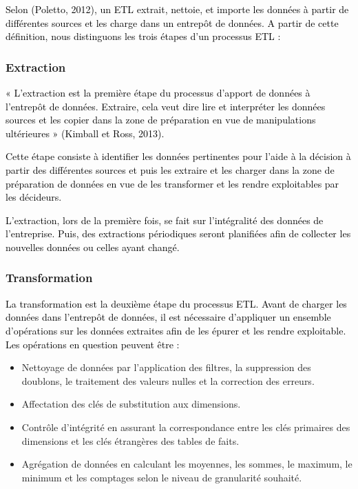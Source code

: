 \textcolor{black}{
Selon (Poletto, 2012), un ETL extrait, nettoie, et importe les données à partir de  différentes sources et les charge dans un entrepôt de données.}
\textcolor{black}{
A partir de cette définition, nous distinguons les trois étapes d’un processus ETL :}

\subsubsection*{Extraction}

\textcolor{black}{
 « L’extraction est la première étape du processus d'apport de données à l'entrepôt de données. Extraire, cela veut dire lire et interpréter les données sources et les copier dans la zone de préparation en vue de manipulations ultérieures » (Kimball et Ross, 2013).}

\textcolor{black}{
 Cette étape consiste à identifier les données pertinentes pour l’aide à la décision à partir des différentes sources et puis les extraire et les charger dans la zone de préparation de données en vue de les transformer et les rendre exploitables par les décideurs.}

\textcolor{black}{
 L’extraction, lors de la première fois, se fait sur l’intégralité des données de l’entreprise. Puis, des extractions périodiques seront planifiées afin de collecter les nouvelles données ou celles ayant changé.}

\subsubsection*{Transformation}

\textcolor{black}{
La transformation est la deuxième étape du processus ETL.  Avant de charger les données dans l’entrepôt de données, il est nécessaire d’appliquer un ensemble d’opérations sur les données extraites afin de les épurer et les rendre exploitable.}
\textcolor{black}{
Les opérations en question peuvent être :}

\begin{itemize}
	\item Nettoyage de données par l’application des filtres, la suppression des doublons, le traitement des valeurs nulles et la correction des erreurs.
	\item	Affectation des clés de substitution aux dimensions.
	\item	Contrôle d’intégrité en assurant la correspondance entre les clés primaires des dimensions et les clés étrangères des tables de faits.
	\item	Agrégation de données en calculant les moyennes, les sommes, le maximum, le minimum et les comptages selon le niveau de granularité souhaité.
	
\end{itemize}

